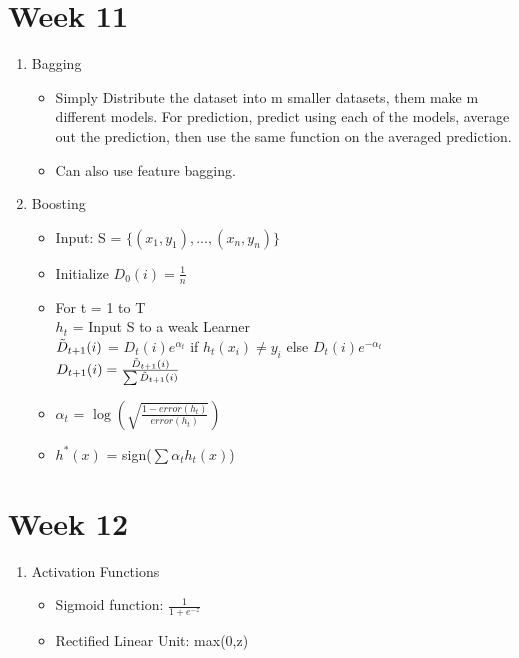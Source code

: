 \documentclass[a4paper]{article}
\begin{document}
\section{Week 11}
\begin{enumerate}
    \item Bagging
    \begin{itemize}
        \item Simply Distribute the dataset into m smaller datasets, them make m different models. For prediction, predict using each of the models, average out the prediction, then use the same function on the averaged prediction.
        \item Can also use feature bagging.
    \end{itemize}
    \item Boosting
    \begin{itemize}
        \item Input: S = $\{(x_1,y_1),...,(x_n,y_n)\}$
        \item Initialize $D_0(i) = \frac{1}{n}$
        \item For t = 1 to T\\
        $h_t$ = Input S to a weak Learner\\
        $\Tilde{D}_{t+1}(i)$ = $D_t(i)e^{\alpha_t}$ if $h_t(x_i)\neq y_i$ else $D_t(i)e^{-\alpha_t}$\\
        $D_{t+1}(i) = \frac{\Tilde{D}_{t+1}(i)}{\sum\Tilde{D}_{t+1}(i)}$
        \item $\alpha_t$ = $\log(\sqrt{\frac{1 - error(h_t)}{error(h_t)}})$
        \item $h^*(x)$ = sign($\sum\alpha_th_t(x)$)
    \end{itemize}
\end{enumerate}
\section{Week 12}
\begin{enumerate}
    \item Activation Functions
    \begin{itemize}
        \item Sigmoid function: $\frac{1}{1+e^{-z}}$
        \item Rectified Linear Unit: max(0,z)
    \end{itemize}
\end{enumerate}
\end{document}

